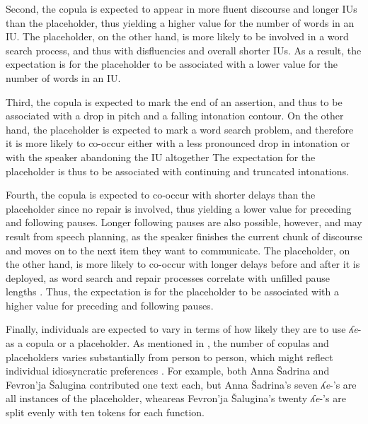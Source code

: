 \documentclass[output=paper,colorlinks,citecolor=brown
\ChapterDOI{10.5281/zenodo.15697581}
]{langscibook}
\begin{document}
Second, the copula is expected to appear in more fluent discourse and longer IUs than the placeholder, thus yielding a higher value for the number of words in an IU. 
The placeholder, on the other hand, is more likely to be involved in a word search process, and thus with disfluencies \citep{Zhao&Jurafsky2005} and overall shorter IUs.
As a result, the expectation is for the placeholder to be associated with a lower value for the number of words in an IU.

Third, the copula is expected to mark the end of an assertion, and thus to be associated with a drop in pitch and a falling intonation contour.  
On the other hand, the placeholder is expected to mark a word search problem, and therefore it is more likely to co-occur either with a less pronounced drop in intonation or with the speaker abandoning the IU altogether  
The expectation for the placeholder is thus to be associated with continuing and truncated intonations. 

Fourth, the copula is expected to co-occur with shorter delays than the placeholder since no repair is involved, thus yielding a lower value for preceding and following pauses. 
Longer following pauses are also possible, however, and may result from speech planning, as the speaker finishes the current chunk of discourse and moves on to the next item they want to communicate.
The placeholder, on the other hand, is more likely to co-occur with longer delays before and after it is deployed, as word search and repair processes correlate with unfilled pause lengths \citep{Clark&FoxTree2002}. 
Thus, the expectation is for the placeholder to be associated with a higher value for preceding and following pauses.

Finally, individuals are expected to vary in terms of how likely they are to use \textit{ʎe}- as a copula or a placeholder. 
As mentioned in , the number of copulas and placeholders varies substantially from person to person, which might reflect individual idiosyncratic preferences \citep{Clark&FoxTree2002}.
For example, both Anna Šadrina and Fevron'ja Šalugina contributed one text each, but Anna Šadrina's seven \textit{ʎe}-'s are all instances of the placeholder, wheareas Fevron'ja Šalugina's twenty \textit{ʎe}-'s are split evenly with ten tokens for each function. 
\end{document}
